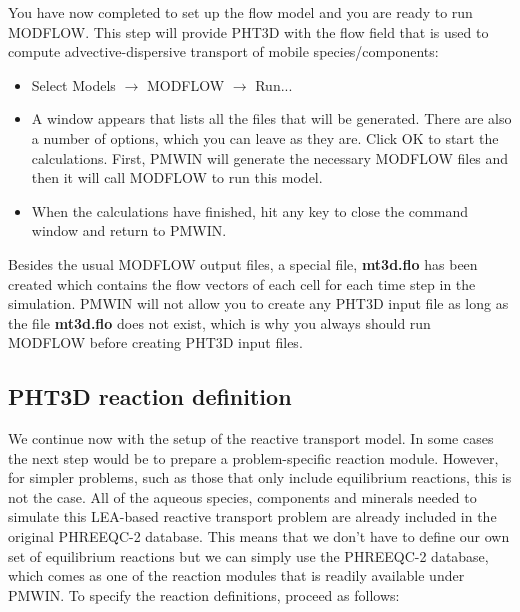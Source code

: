 You have now completed to set up the flow model and you are ready to run MODFLOW.
This step will provide PHT3D with the flow field that is used to compute advective-dispersive
transport of mobile species/components:

\begin{itemize}

\item Select Models $\rightarrow$ MODFLOW $\rightarrow$ Run...

\item A window appears that lists all the files that will be generated. There are also a number of options, which you can leave as they are. Click OK to start the calculations. First, PMWIN will generate the necessary MODFLOW files and then it will call MODFLOW to run this model. 

\item When the calculations have finished, hit any key to close the command window and return to PMWIN.

\end{itemize}

Besides the usual MODFLOW output files, a special file, {\color{red} \textbf{mt3d.flo}} has been created which contains the flow vectors of each cell for each time step in the simulation. PMWIN will not allow you to create any PHT3D input file as long as the file {\color{red} \textbf{mt3d.flo}} does not exist, which is why you always should run MODFLOW before creating PHT3D input files.

\subsection[PHT3D reaction definition]{PHT3D reaction definition}

We continue now with the setup of the reactive transport model. In some cases
the next step would be to prepare a problem-specific reaction module.   
However, for simpler problems, such as those that only include equilibrium
reactions, this is not the case. All of the aqueous species, components and minerals needed to
simulate this LEA-based reactive transport problem are already
included in the original PHREEQC-2 database. This means that we don't have to define our own set of equilibrium reactions but we can simply use the PHREEQC-2 database, which comes 
as one of the reaction modules that is readily available under PMWIN. 
To specify the reaction definitions, proceed as follows:

